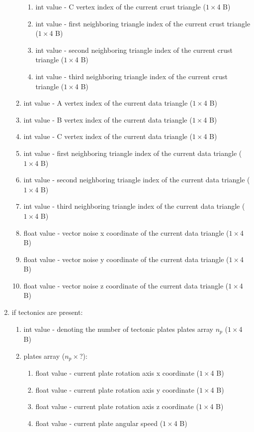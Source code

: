\begin{enumerate}
\begin{enumerate}
\begin{enumerate}
\item int value - C vertex index of the current crust triangle ($1\times$4 B)
\item int value - first neighboring triangle index of the current crust triangle ($1\times$4 B)
\item int value - second neighboring triangle index of the current crust triangle ($1\times$4 B)
\item int value - third neighboring triangle index of the current crust triangle ($1\times$4 B)
\end{enumerate}
\item int value - A vertex index of the current data triangle ($1\times$4 B)
\item int value - B vertex index of the current data triangle ($1\times$4 B)
\item int value - C vertex index of the current data triangle ($1\times$4 B)
\item int value - first neighboring triangle index of the current data triangle ($1\times$4 B)
\item int value - second neighboring triangle index of the current data triangle ($1\times$4 B)
\item int value - third neighboring triangle index of the current data triangle ($1\times$4 B)
\item float value - vector noise x coordinate of the current data triangle ($1\times$4 B)
\item float value - vector noise y coordinate of the current data triangle ($1\times$4 B)
\item float value - vector noise z coordinate of the current data triangle ($1\times$4 B)
\end{enumerate}
\item if tectonics are present:
\begin{enumerate}
\item int value - denoting the number of tectonic plates plates array $n_p$ ($1\times$4 B)
\item plates array ($n_p\times$?):
\begin{enumerate}
\item float value - current plate rotation axis x coordinate ($1\times$4 B)
\item float value - current plate rotation axis y coordinate ($1\times$4 B)
\item float value - current plate rotation axis z coordinate ($1\times$4 B)
\item float value - current plate angular speed ($1\times$4 B)

\end{enumerate}
\end{enumerate}
\end{enumerate}
